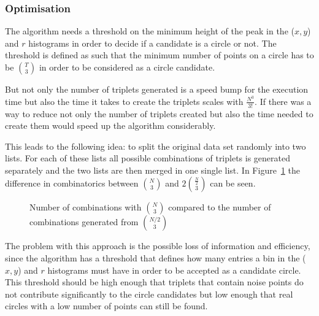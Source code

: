 \documentclass[11pt]{scrreprt}
\begin{document}
\subsubsection{Optimisation} %
\label{ssub:improvement_of_speed}

The algorithm needs a threshold on the minimum height of the peak in the ($x,y$) and $r$ histograms in order to decide if a candidate is a circle or not. The threshold is defined as such that the minimum number of points on a circle has to be $\binom{T}{3}$ in order to be considered as a circle candidate. 

But not only the number of triplets generated is a speed bump for the execution time but also the time it takes to create the triplets scales with $\frac{N^3}{3!}$. If there was a way to reduce not only the number of triplets created but also the time needed to create them would speed up the algorithm considerably.

This leads to the following idea: to split the original data set randomly into two lists. For each of these lists all possible combinations 
of triplets is generated separately and the two lists are then merged in one single list. In Figure~\ref{fig:binom_half_growth} 
the difference in combinatorics between $\binom{N}{3}$ and $2\binom{\frac{N}{2}}{3}$ can be seen.

\begin{figure}[b]
\centering
  \caption{Number of combinations with $\binom{N}{3}$ compared to the number of combinations generated from $\binom{N/2}{3}$}
  \label{fig:binom_half_growth}
\end{figure}

The problem with this approach is the possible loss of information and efficiency, since the
algorithm has a threshold that defines how many entries a bin in the ($x,y$) and $r$ histograms must 
have in order to be accepted as a candidate circle.
This threshold should be high enough that triplets that contain noise points
do not contribute significantly to the circle candidates but low enough that real circles with a
low number of points can still be found.
\end{document}
